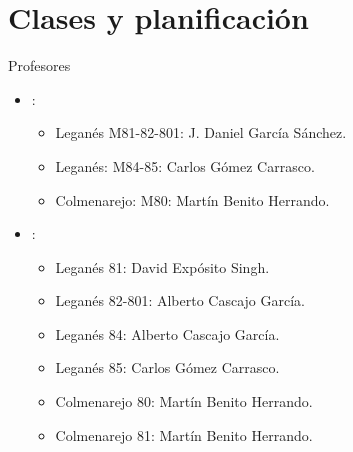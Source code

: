 \section{Clases y planificación}

\begin{frame}[t]{Profesores}
\begin{itemize}
  \item {}: 
    \begin{itemize}
      \item Leganés M81-82-801: J. Daniel García Sánchez.
      \item Leganés: M84-85: Carlos Gómez Carrasco.
      \item Colmenarejo: M80: Martín Benito Herrando.
    \end{itemize}
  \item {}: 
    \begin{itemize}
      \item Leganés 81: David Expósito Singh.
      \item Leganés 82-801: Alberto Cascajo García.
      \item Leganés 84: Alberto Cascajo García.
      \item Leganés 85: Carlos Gómez Carrasco.
      \item Colmenarejo 80: Martín Benito Herrando.
      \item Colmenarejo 81: Martín Benito Herrando.
    \end{itemize}
\end{itemize}
\end{frame}

